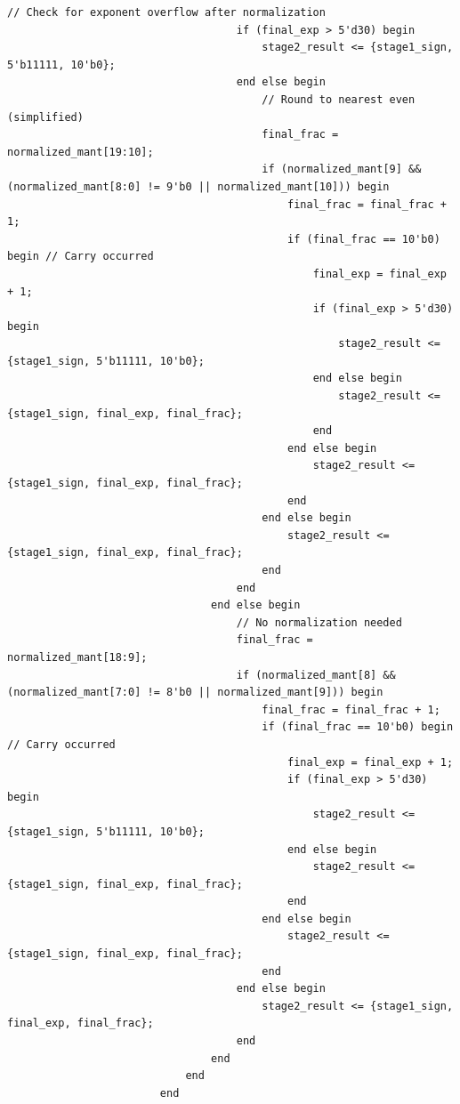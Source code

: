 \documentclass[UTF8]{ctexart}
\begin{document}
\begin{lstlisting}[frame=shadowbox,caption=fp\_multiplier\_generated.v]
                                    // Check for exponent overflow after normalization
                                    if (final_exp > 5'd30) begin
                                        stage2_result <= {stage1_sign, 5'b11111, 10'b0};
                                    end else begin
                                        // Round to nearest even (simplified)
                                        final_frac = normalized_mant[19:10];
                                        if (normalized_mant[9] && (normalized_mant[8:0] != 9'b0 || normalized_mant[10])) begin
                                            final_frac = final_frac + 1;
                                            if (final_frac == 10'b0) begin // Carry occurred
                                                final_exp = final_exp + 1;
                                                if (final_exp > 5'd30) begin
                                                    stage2_result <= {stage1_sign, 5'b11111, 10'b0};
                                                end else begin
                                                    stage2_result <= {stage1_sign, final_exp, final_frac};
                                                end
                                            end else begin
                                                stage2_result <= {stage1_sign, final_exp, final_frac};
                                            end
                                        end else begin
                                            stage2_result <= {stage1_sign, final_exp, final_frac};
                                        end
                                    end
                                end else begin
                                    // No normalization needed
                                    final_frac = normalized_mant[18:9];
                                    if (normalized_mant[8] && (normalized_mant[7:0] != 8'b0 || normalized_mant[9])) begin
                                        final_frac = final_frac + 1;
                                        if (final_frac == 10'b0) begin // Carry occurred
                                            final_exp = final_exp + 1;
                                            if (final_exp > 5'd30) begin
                                                stage2_result <= {stage1_sign, 5'b11111, 10'b0};
                                            end else begin
                                                stage2_result <= {stage1_sign, final_exp, final_frac};
                                            end
                                        end else begin
                                            stage2_result <= {stage1_sign, final_exp, final_frac};
                                        end
                                    end else begin
                                        stage2_result <= {stage1_sign, final_exp, final_frac};
                                    end
                                end
                            end
                        end
                        

\end{lstlisting}
\end{document}
